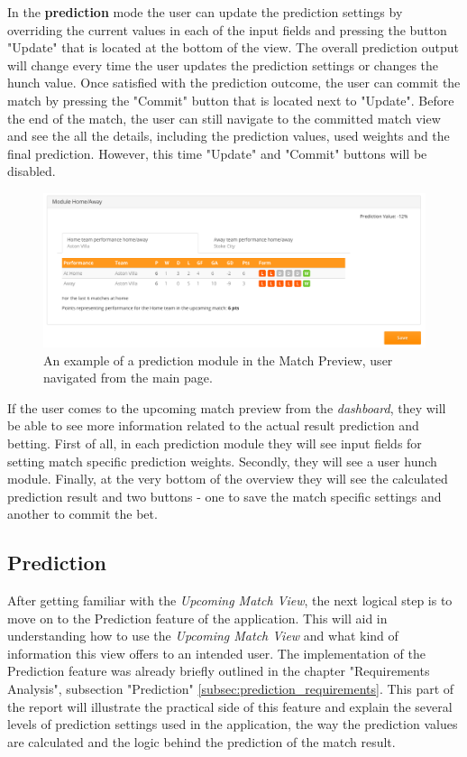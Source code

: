 In the \textbf{prediction} mode the user can update the prediction settings by overriding the current values in each of the input fields and pressing the button "Update" that is located at the bottom of the view. The overall prediction output will change every time the user updates the prediction settings or changes the hunch value. Once satisfied with the prediction outcome, the user can commit the match by pressing the "Commit" button that is located next to "Update". Before the end of the match, the user can still navigate to the committed match view and see the all the details, including the prediction values, used weights and the final prediction. However, this time "Update" and "Commit" buttons will be disabled.

\begin{figure}[H]
	\begin{center}
		\includegraphics[width=.90\textwidth]{impl/images/matchoverviewex_from_main_page}
		\caption{An example of a prediction module in the Match Preview, user navigated from the main page.} \label{fig:using: matchoverviewex_from_main_page}
	\end{center}
\end{figure}

If the user comes to the upcoming match preview from the \emph{dashboard}, they will be able to see more information related to the actual result prediction and betting.
First of all, in each prediction module they will see input fields for setting match specific prediction weights. Secondly, they will see a user hunch module. Finally, at the very bottom of the overview they will see the calculated prediction result and two buttons - one to save the match specific settings and another to commit the bet.


\subsection{Prediction}
\label{subsec:prediction_implementation}
After getting familiar with the \emph{Upcoming Match View}, the next logical step is to move on to the Prediction feature of the application. This will aid in understanding how to use the \emph{Upcoming Match View} and what kind of information this view offers to an intended user. The implementation of the Prediction feature was already briefly outlined in the chapter "Requirements Analysis", subsection "Prediction" \ref{subsec:prediction_requirements}. This part of the report will illustrate the practical side of this feature and explain the several levels of prediction settings used in the application, the way the prediction values are calculated and the logic behind the prediction of the match result.

